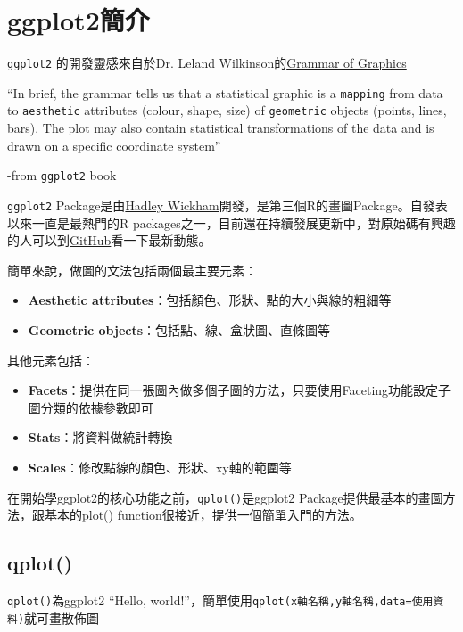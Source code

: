 \documentclass[]{book}
\providecommand{\tightlist}{%
  \setlength{\itemsep}{0pt}\setlength{\parskip}{0pt}}
\theoremstyle{definition}
\theoremstyle{definition}
\theoremstyle{remark}
\begin{document}
\section{ggplot2簡介}\label{ggplot2}

\texttt{ggplot2} \citep{R-ggplot2}的開發靈感來自於Dr. Leland
Wilkinson的\href{http://www.springer.com/us/book/9780387245447}{Grammar
of Graphics}

``In brief, the grammar tells us that a statistical graphic is a
\texttt{mapping} from data to \texttt{aesthetic} attributes (colour,
shape, size) of \texttt{geometric} objects (points, lines, bars). The
plot may also contain statistical transformations of the data and is
drawn on a specific coordinate system''

-from \texttt{ggplot2} book

\texttt{ggplot2} Package是由\href{http://hadley.nz/}{Hadley
Wickham}開發，是第三個R的畫圖Package。自發表以來一直是最熱門的R
packages之一，目前還在持續發展更新中，對原始碼有興趣的人可以到\href{https://github.com/tidyverse/ggplot2}{GitHub}看一下最新動態。

簡單來說，做圖的文法包括兩個最主要元素：

\begin{itemize}
\tightlist
\item
  \textbf{Aesthetic attributes}：包括顏色、形狀、點的大小與線的粗細等
\item
  \textbf{Geometric objects}：包括點、線、盒狀圖、直條圖等
\end{itemize}

其他元素包括：

\begin{itemize}
\tightlist
\item
  \textbf{Facets}：提供在同一張圖內做多個子圖的方法，只要使用Faceting功能設定子圖分類的依據參數即可
\item
  \textbf{Stats}：將資料做統計轉換
\item
  \textbf{Scales}：修改點線的顏色、形狀、xy軸的範圍等
\end{itemize}

在開始學ggplot2的核心功能之前，\texttt{qplot()}是ggplot2
Package提供最基本的畫圖方法，跟基本的plot()
function很接近，提供一個簡單入門的方法。

\subsection{qplot()}\label{qplot}

\texttt{qplot()}為ggplot2 ``Hello,
world!''，簡單使用\texttt{qplot(x軸名稱,y軸名稱,data=使用資料)}就可畫散佈圖
\end{document}

